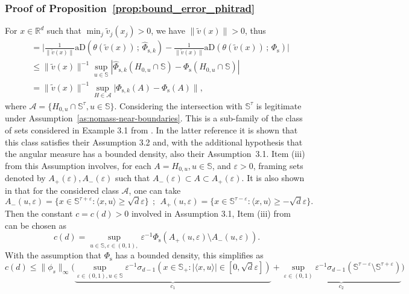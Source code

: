 \documentclass{article}
\numberwithin{equation}{section}
\newcommand{\rset}{\mathbb{R}}
\newcommand{\sphere}{\mathbb{S}}
\newcommand{\XpDsymbol}{\mathrm{XpD}}  %
\newcommand{\hatcoDs}[1]{\widehat{\XpDsymbol}_s\left({#1}\right)}
\newcommand{\coDsinf}[1]{\pD_{s,\infty}({#1})}
\newcommand{\aD}[2]{{\mathrm{aD}}\left({#1}\,;\,{#2}\right)}
\newcommand{\Phitrad}{\Phi_{\mathrm{s}}} %
\newcommand{\hatPhitrad}{\widehat{\Phi}_{\mathrm{s},k}} %
\begin{document}
\subsubsection{Proof of Proposition~\ref{prop:bound_error_phitrad}}\label{subsubsec:A1}
For  $x \in\rset^d$ such that $\min_j\tilde v_j(x_j)>0$, we have
$\|\tilde v(x)\|>0$, thus
\begin{align*}
    & =  \Big| \frac{1}{\|\tilde v(x)\|}\aD{\theta(\tilde v(x))}{\hatPhitrad} -
                                            \frac{1}{\|\tilde v(x)\|}\aD{\theta(\tilde v(x))}{\Phitrad}\Big| \\
    & \le \|\tilde v(x)\|^{-1} \sup_{u\in \sphere } |\hatPhitrad(H_{0,u}\cap \sphere) - \Phitrad(H_{0,u}\cap\sphere)| \\
    & = \|\tilde v(x)\|^{-1} \sup_{H \in \mathcal{A}} |\hatPhitrad(A) - \Phitrad(A)\|, 
  \end{align*}
  where  $\mathcal{A} =  \{ H_{0,u}\cap \sphere^\tau, u\in\sphere \}$. Considering the intersection with $\sphere^\tau$ is legitimate under Assumption~\ref{as:nomass-near-boundaries}. 
  This is a sub-family of the class of sets considered in Example 3.1 from \cite{ClemenconJalalzaiSabourinSegers2023}. In the latter reference it is shown that this class satisfies their Assumption 3.2 and, with the additional hypothesis  that the angular measure has a bounded density,  also their Assumption~3.1. 
  Item (iii) from this Assumption involves, for each $A = H_{0,u}, u\in\sphere$, and $\varepsilon>0$, framing sets denoted by $
  A_+(\varepsilon), A_-(\varepsilon)
  $ such that $A_-(\varepsilon)\subset A \subset A_+(\varepsilon)$. It is also shown in \cite{ClemenconJalalzaiSabourinSegers2023} that for the considered class $\mathcal{A}$, one can take 
  $$
  A_-(u,\varepsilon) = \{x\in\sphere^{\tau+\varepsilon}: \langle x, u\rangle \ge \sqrt{d}\varepsilon \}~~;~~
  A_+(u,\varepsilon) = \{x\in\sphere^{\tau-\varepsilon}: \langle x, u\rangle \ge -\sqrt{d}\varepsilon \}. 
  $$
Then the constant $c = c(d)>0$ involved in Assumption 3.1, Item (iii) from~\cite{ClemenconJalalzaiSabourinSegers2023} can be chosen as 
$$
c(d) = \sup_{u\in\sphere, \varepsilon\in(0,1), } 
\varepsilon^{-1}\Phitrad(A_+(u,\varepsilon)\setminus A_-(u,\varepsilon)). 
$$
With the assumption that $\Phitrad$ has a bounded density, this simplifies as 
$$
c(d)  \le \|\phi_s\|_\infty\bigg(
\underbrace{\sup_{\varepsilon\in(0,1), u \in \sphere}
\varepsilon^{-1}\sigma_{d-1}(x\in\sphere_+: 
\big| \langle x, u \rangle \big| \in [0,\sqrt d \varepsilon] ) }_{c_1}
+ 
\underbrace{ \sup_{\varepsilon\in(0,1)}
\varepsilon^{-1}\sigma_{d-1}(\sphere^{\tau-\varepsilon}\setminus\sphere^{\tau+\varepsilon})}_{c_2}
\bigg)  
$$
\end{document}

